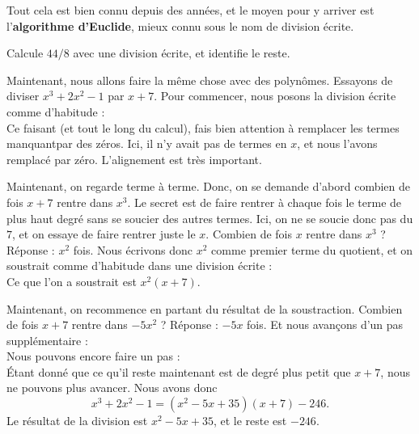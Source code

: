 \documentclass[a4paper,12pt]{book}
\theoremstyle{mes_exemples}	\newtheorem{exemple}[numtho]{Exemple}
\theoremstyle{mes_tho}
\newcommand{\defe}[2]{\textbf{#1}\index{#2}}
\begin{document}
Tout cela est bien connu depuis des années, et le moyen pour y arriver est l'\defe{algorithme d'Euclide}{Algorithme d'Euclide}, mieux connu sous le nom de \og division écrite\fg{}.

\begin{exercice}
Calcule $44/8$ avec une division écrite, et identifie le reste.
\end{exercice}

Maintenant, nous allons faire la même chose avec des polynômes. Essayons de diviser $x^3+2x^2-1$ par $x+7$. Pour commencer, nous posons la division écrite comme d'habitude :
\begin{equation}
	
\end{equation}
Ce faisant (et tout le long du calcul), fais bien attention à remplacer les termes \og manquant\fg par des zéros. Ici, il n'y avait pas de termes en $x$, et nous l'avons remplacé par zéro. L'alignement est très important.


Maintenant, on regarde terme à terme. Donc, on se demande d'abord combien de fois $x+7$ rentre dans $x^3$. Le secret est de faire rentrer à chaque fois le terme de plus haut degré sans se soucier des autres termes. Ici, on ne se soucie donc pas du $7$, et on essaye de faire rentrer juste le $x$. Combien de fois $x$ rentre dans $x^3$ ? Réponse : $x^2$ fois. Nous écrivons donc $x^2$ comme premier terme du quotient, et on soustrait comme d'habitude dans une division écrite :
\begin{equation}
	
\end{equation}
Ce que l'on a soustrait est $x^2(x+7)$.

Maintenant, on recommence en partant du résultat de la soustraction. Combien de fois $x+7$ rentre dans $-5x^2$ ? Réponse : $-5x$ fois. Et nous avançons d'un pas supplémentaire :
\begin{equation}
	
\end{equation}
Nous pouvons encore faire un pas :
\begin{equation}
	
\end{equation}
Étant donné que ce qu'il reste maintenant est de degré plus petit que $x+7$, nous ne pouvons plus avancer. Nous avons donc
\begin{equation}
	 x^3+2x^2-1 = (x^2-5x+35)(x+7) - 246.
\end{equation}
Le résultat de la division est $x^2-5x+35$, et le reste est $-246$.
\end{document}
